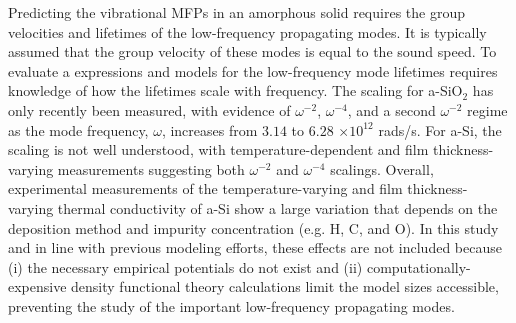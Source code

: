 \documentclass[aps,prb,onecolumn,preprint,superscriptaddress,footinbib,amsmath,amssymb,floatfix]{revtex4}
\begin{document}
Predicting the vibrational MFPs in an amorphous solid 
requires the group velocities and lifetimes 
of the low-frequency propagating modes.
\cite{freeman_thermal_1986,graebner_phonon_1986,
love_estimate_1990,feldman_thermal_1993,cahill_thermal_1994,
feldman_numerical_1999,zink_thermal_2006,baldi_thermal_2008,
liu_high_2009,yang_anomalously_2010,hondongwa_ultrasonic_2011} 
It is typically assumed that 
the group velocity of these modes is equal to the sound speed. 
To evaluate a expressions and models for the low-frequency 
mode lifetimes requires knowledge of how the lifetimes 
scale with frequency.
The scaling for a-SiO$_2$ has only recently been measured, 
with evidence of $\omega^{-2}$, $\omega^{-4}$, and a 
second $\omega^{-2}$ regime as the mode frequency, $\omega$, 
increases from $3.14$ to $6.28$ $\times 10^{12}$ rads/s.
\cite{masciovecchio_evidence_2006,
baldi_sound_2010,baldi_elastic_2011,baldi_emergence_2013} 
For a-Si, the scaling is not well understood, 
with temperature-dependent and film thickness-varying measurements
suggesting both $\omega^{-2}$ and $\omega^{-4}$ scalings.
\cite{pompe_thermal_1988,hasselman_thermal_1989,
kuo_thermal_1992,feldman_thermal_1993,cahill_thermal_1994,
wada_thermal_1996,feldman_numerical_1999,moon_thermal_2002,
zink_thermal_2006,zink_excess_2006,liu_high_2009,
yang_anomalously_2010,he_heat_2011,hondongwa_ultrasonic_2011} 
Overall, experimental measurements of the temperature-varying 
and film thickness-varying thermal conductivity of a-Si show a large 
variation that depends on the deposition method and impurity 
concentration (e.g. H, C, and O).
\cite{liu_high_2009,yang_anomalously_2010,vacher_attenuation_1980,
li_effect_2011} 
In this study and in line with previous modeling efforts, 
these effects are not included because (i) 
the necessary empirical potentials do not exist and (ii) 
computationally-expensive density functional theory calculations 
limit the model sizes accessible,
\cite{feldman_thermal_1993,feldman_numerical_1999,
bernstein_structural_2006,liu_high_2009,yang_anomalously_2010} 
preventing the study of the important low-frequency propagating 
modes.
\end{document}

